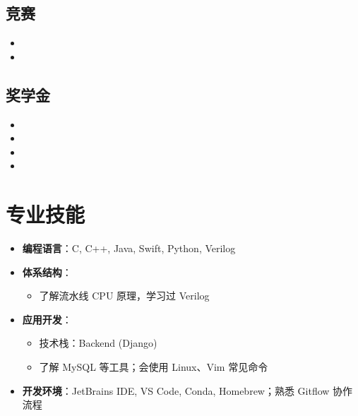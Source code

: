 \documentclass{resume}
\begin{document}
\subsection{\textbf{竞赛}}
\begin{itemize}
  \item {}
  \item {}
\end{itemize}

\subsection{\textbf{奖学金}}
\begin{itemize}
  \item {}
  \item {}
  \item {}
  \item {}
\end{itemize}

\section{专业技能}
\begin{itemize}
  \item \textbf{编程语言}：C, C++, Java, Swift, Python, Verilog

  \item \textbf{体系结构}：
    \begin{itemize}
      \item 了解流水线 CPU 原理，学习过 Verilog 
    \end{itemize}

  \item \textbf{应用开发}：
    \begin{itemize}
      \item 技术栈：Backend (Django)
      \item 了解 MySQL 等工具；会使用 Linux、Vim 常见命令
    \end{itemize}

  \item \textbf{开发环境}：JetBrains IDE, VS Code, Conda, Homebrew；熟悉 Gitflow 协作流程
\end{itemize}
\end{document}
